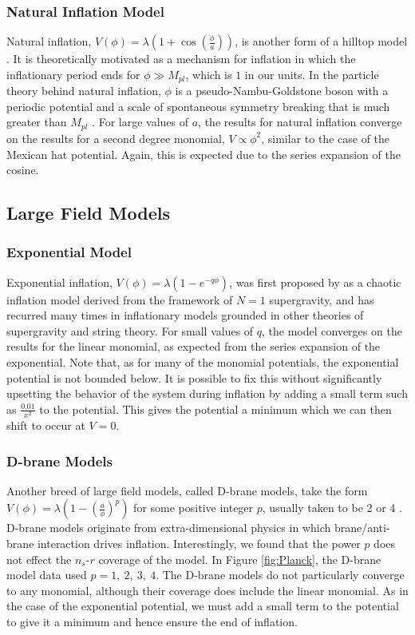 \documentclass[a4paper,11pt]{article}
\def\nsr{$n_s$-$r$ }
\begin{document}
\subsubsection{Natural Inflation Model}
Natural inflation, $V(\phi)=\lambda(1+\cos(\tfrac{\phi}{a}))$, is another form of a hilltop model \citep{Adams+1993}. It is theoretically motivated as a mechanism for inflation in which the inflationary period ends for $\phi\gg M_{pl}$, which is $1$ in our units. In the particle theory behind natural inflation, $\phi$ is a pseudo-Nambu-Goldstone boson with a periodic potential and a scale of spontaneous symmetry breaking that is much greater than $M_{pl}$ \citep{Boubekeur+Lyth2005}. For large values of $a$, the results for natural inflation converge on the results for a second degree monomial, $V\propto\phi^2$, similar to the case of the Mexican hat potential. Again, this is expected due to the series expansion of the cosine. 

\subsection{Large Field Models}
\label{ssec:LargeField}
\subsubsection{Exponential Model}
Exponential inflation, $V(\phi)=\lambda(1-e^{-q\phi})$, was first proposed by \citet{Goncharov+Linde1984} as a chaotic inflation model derived from the framework of $N=1$ supergravity, and has recurred many times in inflationary models grounded in other theories of supergravity and string theory. For small values of $q$, the model converges on the results for the linear monomial, as expected from the series expansion of the exponential. Note that, as for many of the monomial potentials, the exponential potential is not bounded below. It is possible to fix this without significantly upsetting the behavior of the system during inflation by adding a small term such as $\tfrac{0.01}{x^2}$ to the potential. This gives the potential a minimum which we can then shift to occur at $V=0$. 

\subsubsection{D-brane Models}
Another breed of large field models, called D-brane models, take the form $V(\phi)=\lambda(1-(\tfrac{a}{\phi})^p)$ for some positive integer $p$, usually taken to be 2 \citep{Garcia+2002} or 4 \citep{Dvali+Tye1999}. D-brane models originate from extra-dimensional physics in which brane/anti-brane interaction drives inflation. Interestingly, we found that the power $p$ does not effect the \nsr coverage of the model. In Figure \ref{fig:Planck}, the D-brane model data used $p=1,\ 2,\ 3,\ 4$. The D-brane models do not particularly converge to any monomial, although their coverage does include the linear monomial. As in the case of the exponential potential, we must add a small term to the potential to give it a minimum and hence ensure the end of inflation.
\end{document}
